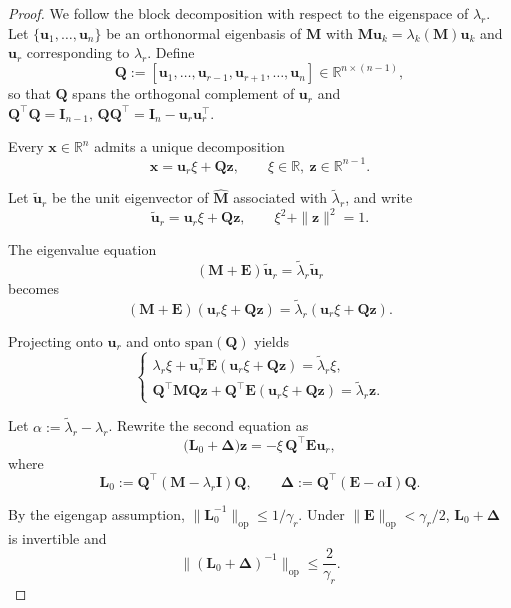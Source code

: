 \documentclass[11pt]{article}
\theoremstyle{plain}
\theoremstyle{remark}
\newcommand{\op}{\mathrm{op}}
\begin{document}
\begin{proof}
We follow the block decomposition with respect to the eigenspace of $\lambda_r$.
Let $\{\mathbf{u}_1,\dots,\mathbf{u}_n\}$ be an orthonormal eigenbasis of $\mathbf{M}$ with
$\mathbf{M}\mathbf{u}_k=\lambda_k(\mathbf{M})\mathbf{u}_k$ and $\mathbf{u}_r$ corresponding to $\lambda_r$.
Define
\[
\mathbf{Q}
:=
[\mathbf{u}_1,\dots,\mathbf{u}_{r-1},\mathbf{u}_{r+1},\dots,\mathbf{u}_n]
\in \mathbb{R}^{n\times(n-1)},
\]
so that $\mathbf{Q}$ spans the orthogonal complement of $\mathbf{u}_r$ and
\(
\mathbf{Q}^\top \mathbf{Q}=\mathbf{I}_{n-1},
\,
\mathbf{Q}\mathbf{Q}^\top=\mathbf{I}_n-\mathbf{u}_r\mathbf{u}_r^\top.
\)

Every $\mathbf{x}\in\mathbb{R}^n$ admits a unique decomposition
\[
\mathbf{x}=\mathbf{u}_r\xi+\mathbf{Q}\mathbf{z},
\qquad
\xi\in\mathbb{R},\ \mathbf{z}\in\mathbb{R}^{n-1}.
\]

Let $\widetilde{\mathbf{u}}_r$ be the unit eigenvector of $\widehat{\mathbf{M}}$
associated with $\widetilde{\lambda}_r$, and write
\[
\widetilde{\mathbf{u}}_r=\mathbf{u}_r\xi+\mathbf{Q}\mathbf{z},
\qquad
\xi^2+\|\mathbf{z}\|^2=1.
\]

The eigenvalue equation
\[
(\mathbf{M}+\mathbf{E})\widetilde{\mathbf{u}}_r
=
\widetilde{\lambda}_r \widetilde{\mathbf{u}}_r
\]
becomes
\[
(\mathbf{M}+\mathbf{E})(\mathbf{u}_r\xi+\mathbf{Q}\mathbf{z})
=
\widetilde{\lambda}_r(\mathbf{u}_r\xi+\mathbf{Q}\mathbf{z}).
\]

Projecting onto $\mathbf{u}_r$ and onto $\text{span}(\mathbf{Q})$ yields
\[
\begin{cases}
\lambda_r\xi + \mathbf{u}_r^\top \mathbf{E}(\mathbf{u}_r\xi+\mathbf{Q}\mathbf{z})
= \widetilde{\lambda}_r \xi, \\[0.3em]
\mathbf{Q}^\top \mathbf{M}\mathbf{Q}\mathbf{z}
+ \mathbf{Q}^\top \mathbf{E}(\mathbf{u}_r\xi+\mathbf{Q}\mathbf{z})
= \widetilde{\lambda}_r \mathbf{z}.
\end{cases}
\]

Let $\alpha:=\widetilde{\lambda}_r-\lambda_r$.
Rewrite the second equation as
\[
\bigl(\mathbf{L}_0 + \mathbf{\Delta}\bigr)\mathbf{z}
=
-\xi\,\mathbf{Q}^\top\mathbf{E}\mathbf{u}_r,
\]
where
\[
\mathbf{L}_0 := \mathbf{Q}^\top(\mathbf{M}-\lambda_r\mathbf{I})\mathbf{Q},
\qquad
\mathbf{\Delta} := \mathbf{Q}^\top(\mathbf{E}-\alpha\mathbf{I})\mathbf{Q}.
\]

By the eigengap assumption, $\|\mathbf{L}_0^{-1}\|_{\op}\le 1/\gamma_r$.
Under $\|\mathbf{E}\|_{\op}<\gamma_r/2$,
$\mathbf{L}_0+\mathbf{\Delta}$ is invertible and
\[
\|(\mathbf{L}_0+\mathbf{\Delta})^{-1}\|_{\op}
\le \frac{2}{\gamma_r}.
\]


\end{proof}
\end{document}
